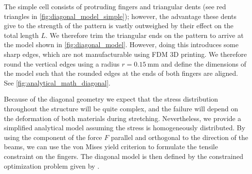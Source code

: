 The simple cell consists of protruding fingers and triangular dents (see red triangles in \cref{fig:diagonal_model_simple});
however, the advantage these dents give to the strength of the pattern is vastly outweighed by their effect on the total length $L$.
We therefore trim the triangular ends on the pattern to arrive at the model shown in \cref{fig:diagonal_model}.
However, doing this introduces some sharp edges, which are not manufacturable using FDM 3D printing.
We therefore round the vertical edges using a radius $r=\SI{0.15}{\milli\meter}$
and define the dimensions of the model such that the rounded edges at the ends of both fingers are aligned.
See \cref{fig:analytical_math_diagonal}.


Because of the diagonal geometry we expect that the stress distribution throughout the structure will be quite complex,
and the failure will depend on the deformation of both materials during stretching.
Nevertheless, we provide a simplified analytical model assuming the stress is homogeneously distributed.
By using the component of the force $F$ parallel and orthogonal to the direction of the beams,
we can use the von Mises yield criterion to formulate the tensile constraint on the fingers.
The diagonal model is then defined by the constrained optimization problem given by .



